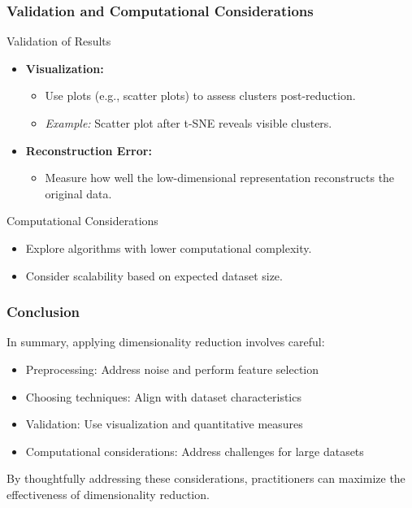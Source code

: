 \documentclass[aspectratio=169]{beamer}
\begin{document}
\begin{frame}[fragile]
    \frametitle{Validation and Computational Considerations}
    \begin{block}{Validation of Results}
        \begin{itemize}
            \item \textbf{Visualization:} 
            \begin{itemize}
                \item Use plots (e.g., scatter plots) to assess clusters post-reduction.
                \item \textit{Example:} Scatter plot after t-SNE reveals visible clusters.
            \end{itemize}
            
            \item \textbf{Reconstruction Error:} 
            \begin{itemize}
                \item Measure how well the low-dimensional representation reconstructs the original data.
            \end{itemize}
        \end{itemize}
    \end{block}

    \begin{block}{Computational Considerations}
        \begin{itemize}
            \item Explore algorithms with lower computational complexity.
            \item Consider scalability based on expected dataset size.
        \end{itemize}
    \end{block}
\end{frame}

\begin{frame}[fragile]
    \frametitle{Conclusion}
    In summary, applying dimensionality reduction involves careful:
    \begin{itemize}
        \item Preprocessing: Address noise and perform feature selection
        \item Choosing techniques: Align with dataset characteristics
        \item Validation: Use visualization and quantitative measures
        \item Computational considerations: Address challenges for large datasets
    \end{itemize}
    
    By thoughtfully addressing these considerations, practitioners can maximize the effectiveness of dimensionality reduction.
\end{frame}
\end{document}
